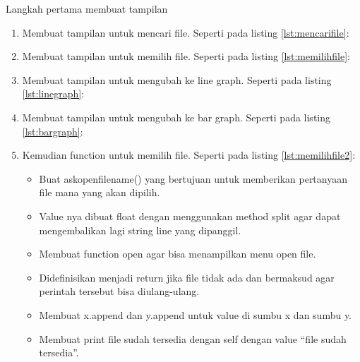 Langkah pertama membuat tampilan
\begin{enumerate}
\item Membuat tampilan untuk mencari file.
Seperti pada listing \ref{lst:mencarifile}:


\item Membuat tampilan untuk memilih file.
Seperti pada listing \ref{lst:memilihfile}:


\item Membuat tampilan untuk mengubah ke line graph.
Seperti pada listing \ref{lst:linegraph}:


\item Membuat tampilan untuk mengubah ke bar graph.
Seperti pada listing \ref{lst:bargraph}:


\item Kemudian function untuk memilih file.
Seperti pada listing \ref{lst:memilihfile2}:

\begin{itemize}
\item Buat askopenfilename() yang bertujuan untuk memberikan pertanyaan file mana yang akan dipilih. 
\item Value nya dibuat float dengan menggunakan method split agar dapat mengembalikan lagi string line yang dipanggil.
\item Membuat function open agar bisa menampilkan menu open file.
\item Didefinisikan menjadi return jika file tidak ada dan bermaksud agar perintah tersebut bisa diulang-ulang.
\item Membuat x.append dan y.append untuk value di sumbu x dan sumbu y.
\item Membuat print file sudah tersedia dengan self dengan value “file sudah tersedia”.
\end{itemize}


\end{enumerate}
